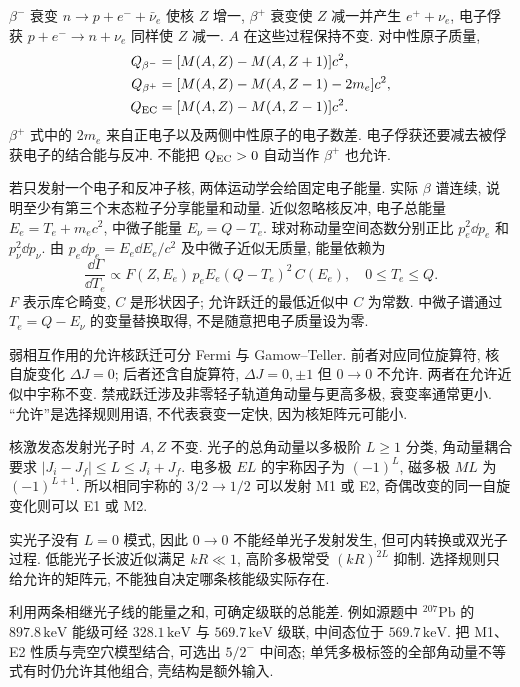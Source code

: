 \label{ch:beta-gamma}
$\beta^-$ 衰变 $n\to p+e^-+\bar\nu_e$ 使核 $Z$ 增一, $\beta^+$ 衰变使 $Z$ 减一并产生 $e^++\nu_e$, 电子俘获 $p+e^-\to n+\nu_e$ 同样使 $Z$ 减一. $A$ 在这些过程保持不变. 对中性原子质量,
\begin{align*}
 Q_{\beta^-}&=[M(A,Z)-M(A,Z+1)]c^2,\\
 Q_{\beta^+}&=[M(A,Z)-M(A,Z-1)-2m_e]c^2,\\
 Q_{\rm EC}&=[M(A,Z)-M(A,Z-1)]c^2.
\end{align*}
$\beta^+$ 式中的 $2m_e$ 来自正电子以及两侧中性原子的电子数差. 电子俘获还要减去被俘获电子的结合能与反冲. 不能把 $Q_{\rm EC}>0$ 自动当作 $\beta^+$ 也允许.

若只发射一个电子和反冲子核, 两体运动学会给固定电子能量. 实际 $\beta$ 谱连续, 说明至少有第三个末态粒子分享能量和动量. 近似忽略核反冲, 电子总能量 $E_e=T_e+m_ec^2$, 中微子能量 $E_\nu=Q-T_e$. 球对称动量空间态数分别正比 $p_e^2\dd p_e$ 和 $p_\nu^2\dd p_\nu$. 由 $p_e\dd p_e=E_e\dd E_e/c^2$ 及中微子近似无质量, 能量依赖为
\begin{equation}\label{eq:beta-spectrum}
 \frac{\dd\Gamma}{\dd T_e}\propto F(Z,E_e)\,p_eE_e(Q-T_e)^2\,C(E_e),\quad0\le T_e\le Q.
\end{equation}
$F$ 表示库仑畸变, $C$ 是形状因子; 允许跃迁的最低近似中 $C$ 为常数. 中微子谱通过 $T_e=Q-E_\nu$ 的变量替换取得, 不是随意把电子质量设为零.

弱相互作用的允许核跃迁可分 Fermi 与 Gamow--Teller. 前者对应同位旋算符, 核自旋变化 $\Delta J=0$; 后者还含自旋算符, $\Delta J=0,\pm1$ 但 $0\to0$ 不允许. 两者在允许近似中宇称不变. 禁戒跃迁涉及非零轻子轨道角动量与更高多极, 衰变率通常更小. ``允许''是选择规则用语, 不代表衰变一定快, 因为核矩阵元可能小.

核激发态发射光子时 $A,Z$ 不变. 光子的总角动量以多极阶 $L\ge1$ 分类, 角动量耦合要求 $|J_i-J_f|\le L\le J_i+J_f$. 电多极 $EL$ 的宇称因子为 $(-1)^L$, 磁多极 $ML$ 为 $(-1)^{L+1}$. 所以相同宇称的 $3/2\to1/2$ 可以发射 M1 或 E2, 奇偶改变的同一自旋变化则可以 E1 或 M2.

实光子没有 $L=0$ 模式, 因此 $0\to0$ 不能经单光子发射发生, 但可内转换或双光子过程. 低能光子长波近似满足 $kR\ll1$, 高阶多极常受 $(kR)^{2L}$ 抑制. 选择规则只给允许的矩阵元, 不能独自决定哪条核能级实际存在.

利用两条相继光子线的能量之和, 可确定级联的总能差. 例如源题中 ${}^{207}\mathrm{Pb}$ 的 $897.8\,\mathrm{keV}$ 能级可经 $328.1\,\mathrm{keV}$ 与 $569.7\,\mathrm{keV}$ 级联, 中间态位于 $569.7\,\mathrm{keV}$. 把 M1、E2 性质与壳空穴模型结合, 可选出 $5/2^-$ 中间态; 单凭多极标签的全部角动量不等式有时仍允许其他组合, 壳结构是额外输入.

